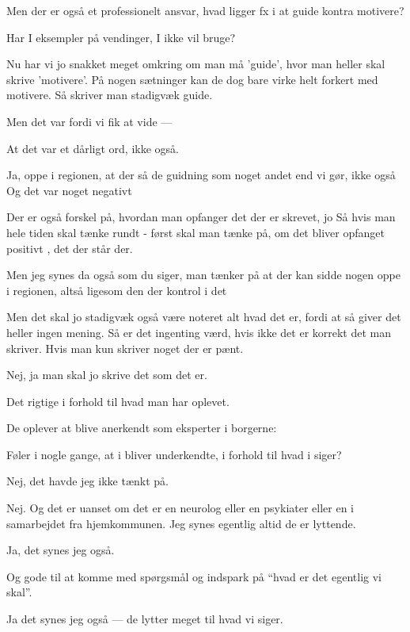 Men der er også et professionelt ansvar, 
hvad ligger fx i at guide kontra motivere?
\begin{description}
\MAA
Har I eksempler på vendinger, I ikke vil bruge?

\AMB
Nu har vi jo snakket meget omkring om man må 'guide', hvor man heller skal skrive 'motivere'.
På nogen sætninger kan de dog bare virke helt forkert med motivere.
Så skriver man stadigvæk guide.

\DMC
Men det var fordi vi fik at vide ---

\AMB
At det var et dårligt ord, ikke også.

\DMC
Ja, oppe i regionen, at der så de guidning som noget andet end vi gør, ikke også
Og det var noget negativt

\AMB
Der er også forskel på, hvordan man opfanger det der er skrevet, jo
Så hvis man hele tiden skal tænke rundt - først skal man tænke på, om det bliver opfanget positivt , det der står der.

\DMC
Men jeg synes da også som du siger, man tænker på at der kan sidde nogen oppe i regionen, altså ligesom den der kontrol i det

\AMB
Men det skal jo stadigvæk også være noteret alt hvad det er, fordi at så giver det heller ingen mening.
Så er det ingenting værd, hvis ikke det er korrekt det man skriver.
Hvis man kun skriver noget der er pænt.

\DMC
Nej, ja man skal jo skrive det som det er.

\AMB
Det rigtige i forhold til hvad man har oplevet.
\end{description}

De oplever at blive anerkendt som eksperter i borgerne:
\begin{description}
\MAA
Føler i nogle gange, at i bliver underkendte, i forhold til hvad i siger?

\DMC
Nej, det havde jeg ikke tænkt på.

\AMB
Nej. Og det er uanset om det er en neurolog eller en psykiater eller en i samarbejdet fra hjemkommunen.
Jeg synes egentlig altid de er lyttende.

\DMC
Ja, det synes jeg også.

\AMB
Og gode til at komme med spørgsmål og indspark på “hvad er det egentlig vi skal”.

\DMC
Ja det synes jeg også — de lytter meget til hvad vi siger.
\end{description}

